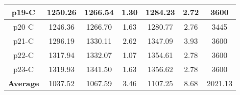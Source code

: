\begin{table*}[!ht]
\begin{minipage}{\columnwidth}
{\begin{tabular}{@{}ccccccc@{}}
			\midrule
			p19-C & 1250.26 & 1266.54 & 1.30 & 1284.23 & 2.72 & 3600 \\
			\midrule
			p20-C & 1246.36 & 1266.70 & 1.63 & 1280.77 & 2.76 & 3445 \\
			\midrule
			p21-C & 1296.19 & 1330.11 & 2.62 & 1347.09 & 3.93 & 3600 \\
			\midrule
			p22-C & 1317.94 & 1332.07 & 1.07 & 1354.61 & 2.78 & 3600 \\
			\midrule
			p23-C & 1319.93 & 1341.50 & 1.63 & 1356.62 & 2.78 & 3600 \\
			\midrule
			\textbf{Average} & 1037.52 & 1067.59 & 3.46 & 1107.25 & 8.68 & 2021.13 \\ \bottomrule
		\end{tabular}%
	}
	\label{tab:table2}
\end{minipage}
\end{table*}